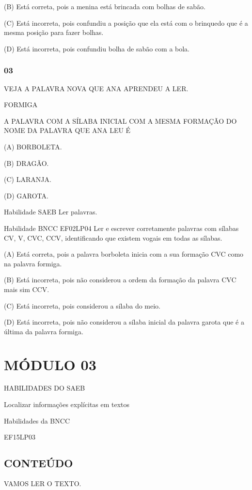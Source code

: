 (B) Está correta, pois a menina está brincada com bolhas de sabão.

(C) Está incorreta, pois confundiu a posição que ela está com o
brinquedo que é a mesma posição para fazer bolhas.

(D) Está incorreta, pois confundiu bolha de sabão com a bola.

\subsubsection{03 }\label{section-28}

VEJA A PALAVRA NOVA QUE ANA APRENDEU A LER.

FORMIGA

A PALAVRA COM A SÍLABA INICIAL COM A MESMA FORMAÇÃO DO NOME DA PALAVRA
QUE ANA LEU É

(A) BORBOLETA.

(B) DRAGÃO.

(C) LARANJA.

(D) GAROTA.

Habilidade SAEB Ler palavras.

Habilidade BNCC EF02LP04 Ler e escrever corretamente palavras com
sílabas CV, V, CVC, CCV, identificando que existem vogais em todas as
sílabas.

(A) Está correta, pois a palavra borboleta inicia com a sua formação CVC
como na palavra formiga.

(B) Está incorreta, pois não considerou a ordem da formação da palavra
CVC mais sim CCV.

(C) Está incorreta, pois considerou a sílaba do meio.

(D) Está incorreta, pois não considerou a sílaba inicial da palavra
garota que é a última da palavra formiga.

\section{MÓDULO 03}\label{muxf3dulo-03}

HABILIDADES DO SAEB

Localizar informações explícitas em textos

Habilidades da BNCC

EF15LP03

\subsection{CONTEÚDO}\label{conteuxfado-2}

VAMOS LER O TEXTO.

